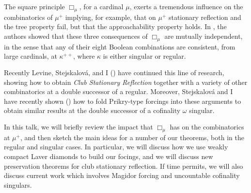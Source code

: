 \documentclass[bsl,meeting]{asl}
\newcommand{\NP}{}
\begin{document}
\thispagestyle{empty}


\NP  
{}

The square principle $\Box_\mu$, for a cardinal $\mu$, exerts a tremendous influence on the combinatorics of $\mu^+$ implying, for example, that on $\mu^+$ stationary reflection and the tree property fail, but that the approachability property holds. In \cite{8fold}, the authors showed that these three consequences of $\Box_\mu$ are mutually independent, in the sense that any of their eight Boolean combinations are consistent, from large cardinals, at $\kappa^{++}$, where $\kappa$ is either singular or regular.

Recently Levine, Stejskalov{\'a}, and I (\cite{GLS:8fold}) have continued this line of research, showing how to obtain \emph{Club Stationary Reflection} together with a variety of other combinatorics at a double successor of a regular. Moreover, Stejskalov{\'a} and I have recently shown (\cite{GS:8foldSingular}) how to fold Prikry-type forcings into these arguments to obtain similar results at the double successor of a cofinality $\omega$ singular.

In this talk, we will briefly review the impact that $\Box_\mu$ has on the combinatorics at $\mu^+$, and then sketch the main ideas for a number of our theorems, both in the regular and singular cases. In particular, we will discuss how we use weakly compact Laver diamonds to build our focings, and we will discuss new preservation theorems for club stationary reflection. If time permits, we will also discuss current work which involves Magidor forcing and uncountable cofinality singulars.


\end{document}

